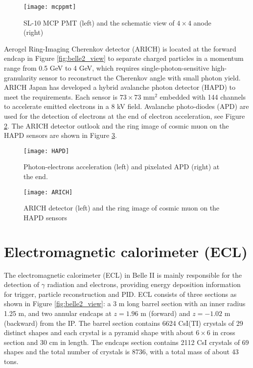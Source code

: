 \begin{figure}[htpb]
	\centering
	\texttt{[image: mcppmt]}
	\caption{SL-10 MCP PMT (left) and the schematic view of $4\times 4$ anode (right)\cite{Abe:2010gxa}}
	\label{fig:mcppmt}
\end{figure}

Aerogel Ring-Imaging Cherenkov
detector (ARICH) is located at the forward endcap in Figure \ref{fig:belle2_view} to separate charged particles in a momentum range from 0.5 GeV to 4 GeV, which requires single-photon-sensitive high-granularity sensor to reconstruct the Cherenkov angle with small photon yield. ARICH 
Japan has developed a hybrid avalanche photon detector (HAPD) to meet the requirements. Each sensor is $73 \times 73$ mm$^2$ embedded with 144 channels to accelerate emitted electrons in a 8 kV field. Avalanche photo-diodes (APD) are used for the detection of electrons at the end of electron acceleration, see Figure \ref{fig:arich_img}. The ARICH detector outlook and the ring image of cosmic muon on the HAPD sensors are shown in Figure \ref{fig:HAPD}.

\begin{figure}[htpb]
	\centering
	\texttt{[image: HAPD]}
	\caption{Photon-electrons acceleration (left) and pixelated APD (right) at the end\cite{Abe:2010gxa}.}
	\label{fig:arich_img}
\end{figure}



\begin{figure}[htpb]
	\centering
	\texttt{[image: ARICH]}
	\caption{ARICH detector (left) and the ring image of cosmic muon on the HAPD sensors\cite{b2book}}
	\label{fig:HAPD}
\end{figure}

\section{Electromagnetic calorimeter (ECL)}
The electromagnetic calorimeter (ECL) in Belle II is mainly responsible for the detection of $\gamma$ radiation and electrons, providing energy deposition information for trigger, particle reconstruction and PID. ECL consists of three sections as shown in Figure \ref{fig:belle2_view}: a 3 m long barrel section with an inner radius 1.25 m, and two annular endcaps at $z = 1.96$ m (forward) and $z = -1.02$ m (backward) from the IP. The barrel section contains 6624 CsI(TI) crystals of 29 distinct shapes and each crystal is a pyramid shape with about $6\times 6$ in cross section and 30 cm in length. The endcaps section contains 2112 CsI crystals of 69 shapes and the total number of crystals is 8736, with a total
mass of about 43 tons\cite{Abe:2010gxa}.

